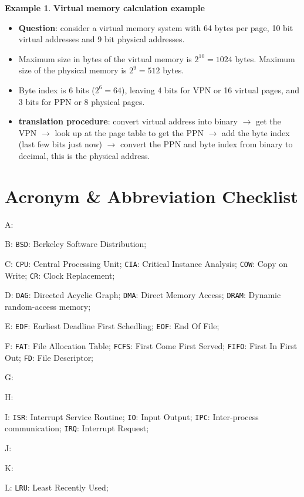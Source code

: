 \documentclass[11pt,a4paper]{article}
\theoremstyle{definition}
\newtheorem{example}{Example}[section]
\newenvironment{myitemize}
{ \begin{itemize}
    \setlength{\itemsep}{5pt}
    \setlength{\parskip}{0pt}
    \setlength{\parsep}{0pt}     }
{ \end{itemize}                  }
\begin{document}
\begin{example}{\textbf{Virtual memory calculation example}}
	\begin{myitemize}
		\item \textbf{Question}: consider a virtual memory system with 64 bytes per page, 10 bit virtual addresses and 9 bit physical addresses.
		\item Maximum size in bytes of the virtual memory is $2^{10}=1024$ bytes. Maximum size of the physical memory is $2^{9}=512$ bytes.
		\item Byte index is 6 bits ($2^6=64$), leaving 4 bits for VPN or 16 virtual pages, and 3 bits for PPN or 8 physical pages.
		\item \textbf{translation procedure}: convert virtual address into binary $\rightarrow$ get the VPN $\rightarrow$ look up at the page table to get the PPN $\rightarrow$ add the byte index (last few bits just now) $\rightarrow$ convert the PPN and byte index from binary to decimal, this is the physical address.
	\end{myitemize}
\end{example}

\newpage
\section{Acronym \& Abbreviation Checklist}
A:

B: \texttt{BSD}: Berkeley Software Distribution; 

C: \texttt{CPU}: Central Processing Unit; \texttt{CIA}: Critical Instance Analysis; \texttt{COW}: Copy on Write; \texttt{CR}: Clock Replacement;

D: \texttt{DAG}: Directed Acyclic Graph; \texttt{DMA}: Direct Memory Access; \texttt{DRAM}: Dynamic random-access memory;

E: \texttt{EDF}: Earliest Deadline First Schedling; \texttt{EOF}: End Of File; 

F: \texttt{FAT}: File Allocation Table; \texttt{FCFS}: First Come First Served; \texttt{FIFO}: First In First Out; \texttt{FD}: File Descriptor; 

G:

H:

I: \texttt{ISR}: Interrupt Service Routine; \texttt{IO}: Input Output; \texttt{IPC}: Inter-process communication; \texttt{IRQ}: Interrupt Request;

J:

K:

L: \texttt{LRU}: Least Recently Used;
\end{document}
